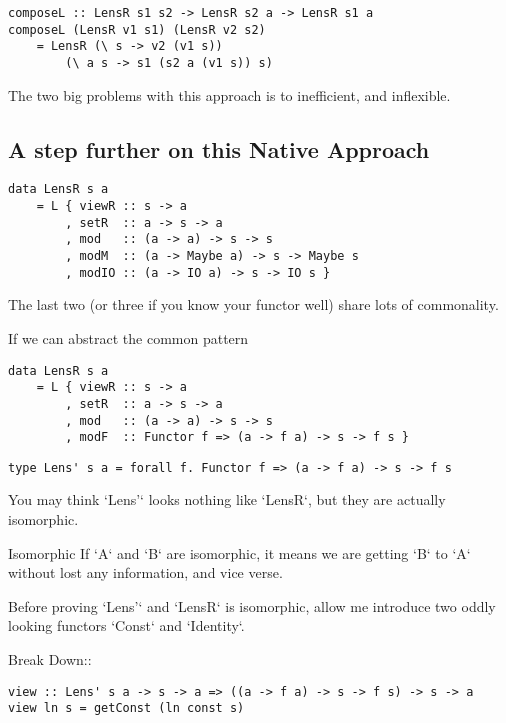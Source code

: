 \begin{verbatim}
composeL :: LensR s1 s2 -> LensR s2 a -> LensR s1 a
composeL (LensR v1 s1) (LensR v2 s2)
    = LensR (\ s -> v2 (v1 s))
        (\ a s -> s1 (s2 a (v1 s)) s)
\end{verbatim}

The two big problems with this approach is to inefficient, and inflexible.

\subsection{A step further on this Native Approach}

\begin{verbatim}
data LensR s a
    = L { viewR :: s -> a
        , setR  :: a -> s -> a
        , mod   :: (a -> a) -> s -> s
        , modM  :: (a -> Maybe a) -> s -> Maybe s
        , modIO :: (a -> IO a) -> s -> IO s }
\end{verbatim}

The last two (or three if you know your functor well) share lots of commonality.

If we can abstract the common pattern

\begin{verbatim}
data LensR s a
    = L { viewR :: s -> a
        , setR  :: a -> s -> a
        , mod   :: (a -> a) -> s -> s
        , modF  :: Functor f => (a -> f a) -> s -> f s }
\end{verbatim}



\begin{verbatim}
type Lens' s a = forall f. Functor f => (a -> f a) -> s -> f s
\end{verbatim}

You may think `Lens'` looks nothing like `LensR`, but they are actually isomorphic.


\begin{WrapText}
 Isomorphic
If `A` and `B` are isomorphic, it means we are getting `B` to `A` without lost any information, and vice verse.
\end{WrapText}

Before proving `Lens'` and `LensR` is isomorphic, allow me introduce two oddly looking functors `Const` and `Identity`.


Break Down::
\begin{verbatim}
view :: Lens' s a -> s -> a => ((a -> f a) -> s -> f s) -> s -> a
view ln s = getConst (ln const s)
\end{verbatim}

